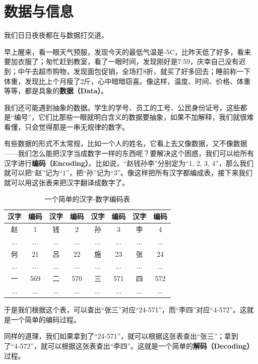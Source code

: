\section{数据与信息}
我们日日夜夜都在与数据打交道。\par
早上醒来，看一眼天气预服，发现今天的最低气温是-5\textdegree C，比昨天低了好多，看来要加衣服了；匆忙赶到教室，看了一眼时间，发现刚好是7:59，庆幸自己没有迟到；中午去超市购物，发现面包促销，全场打8折，就买了好多回去；睡前称一下体重，发现比上个月瘦了2斤，心中暗暗窃喜。像这样，温度、时间、价格、体重等等，都是具象的\textbf{数据（Data）}。\par
我们还可能遇到抽象的数据。学生的学号、员工的工号、公民身份证号，这些都是“编号”，它们比那些一眼就明白含义的数据要抽象，如果不加解释，我们就很难看懂，只会觉得那是一串无规律的数字。\par
有些数据的形式不太常规，比如一个人的姓名，它看上去又像数据，又不像数据——我们怎么能把汉字当成数字一样的东西呢？要解决这个困惑，我们可以给所有汉字进行\textbf{编码（Encoding）}。比如说，``赵钱孙李''分别定为``1, 2, 3, 4''，那么我们就可以把``赵''记为``1''，把``孙''记为``3''。像这样把所有汉字都编成表，接下来我们就可以用这张表来把汉字翻译成数字了。\par
\begin{table}[htbp]
\centering
\begin{tabular}{cccccccc}
\hline
\rule{0pt}{2.4ex}
\textbf{汉字} & \textbf{编码} & \textbf{汉字} & \textbf{编码} & \textbf{汉字} & \textbf{编码} & \textbf{汉字} & \textbf{编码}\\
\hline\hline
\rule{0pt}{2.4ex}
赵 & 1 & 钱 & 2 & 孙 & 3 & 李 & 4 \\
\hline
\rule{0pt}{2.4ex}
... & ... & ... & ... & ... & ... & ... & ... \\
\hline
\rule{0pt}{2.4ex}
何 & 21 & 吕 & 22 & 施 & 23 & 张 & 24 \\
\hline
\rule{0pt}{2.4ex}
... & ... & ... & ... & ... & ... & ... & ... \\
\hline
\rule{0pt}{2.4ex}
一 & 569 & 二 & 570 & 三 & 571 & 四 & 572 \\
\hline
\rule{0pt}{2.4ex}
... & ... & ... & ... & ... & ... & ... & ... \\
\hline
\end{tabular}
\caption{一个简单的汉字-数字编码表}
\end{table}
于是我们根据这个表，可以查出``张三''对应``24-571''，而``李四''对应``4-572''。这就是一个简单的编码过程。\par
同样的道理，我们如果拿到了``24-571''，就可以根据这张表查出``张三''；拿到了``4-572''，就可以根据这张表查出``李四''。这就是一个简单的\textbf{解码（Decoding）}过程。\par
